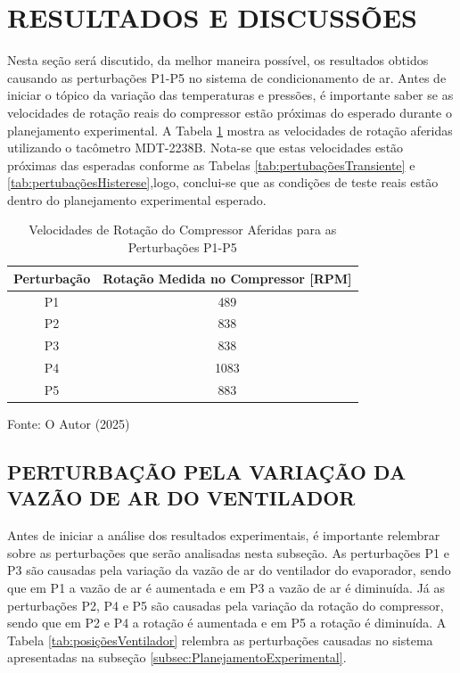 \section{RESULTADOS E DISCUSSÕES}

Nesta seção será discutido, da melhor maneira possível, os resultados obtidos causando as perturbações P1-P5 no sistema de condicionamento de ar. Antes de iniciar o tópico da variação das temperaturas e pressões, é importante saber se as velocidades de rotação reais do compressor estão próximas do esperado durante o planejamento experimental. A Tabela \ref{tab:Rotações Medidas} mostra as velocidades de rotação aferidas utilizando o tacômetro MDT-2238B. Nota-se que estas velocidades estão próximas das esperadas conforme as Tabelas \ref{tab:pertubaçõesTransiente} e \ref{tab:pertubaçõesHisterese},logo, conclui-se que as condições de teste reais estão dentro do planejamento experimental esperado.

\begin{table}[htb]
    \centering
    \begin{tabular}{|c|c|}
        \hline
        \textbf{Perturbação} & \textbf{Rotação Medida no Compressor [RPM]} \\
        \hline
        P1 & 489 \\
        P2 & 838 \\
        P3 & 838 \\        
        P4 & 1083 \\
        P5 & 883 \\
        \hline
    \end{tabular}
    \caption{Velocidades de Rotação do Compressor Aferidas para as Perturbações P1-P5}
    \vspace{5pt} 
{\footnotesize Fonte: O Autor (2025) }
    \label{tab:Rotações Medidas}
\end{table}
\newpage
\subsection{\MakeUppercase{Perturbação pela Variação da Vazão de Ar do Ventilador}} \label{subsec:PertubaçãoVelVentilador}

Antes de iniciar a análise dos resultados experimentais, é importante relembrar sobre as perturbações que serão analisadas nesta subseção. As perturbações P1 e P3 são causadas pela variação da vazão de ar do ventilador do evaporador, sendo que em P1 a vazão de ar é aumentada e em P3 a vazão de ar é diminuída. Já as perturbações P2, P4 e P5 são causadas pela variação da rotação do compressor, sendo que em P2 e P4 a rotação é aumentada e em P5 a rotação é diminuída. A Tabela \ref{tab:posiçõesVentilador} relembra as perturbações causadas no sistema apresentadas na subseção \ref{subsec:PlanejamentoExperimental}.

